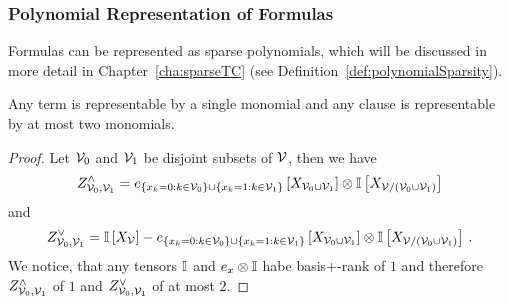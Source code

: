 

\subsubsection{Polynomial Representation of Formulas}


Formulas can be represented as sparse polynomials, which will be discussed in more detail in Chapter~\ref{cha:sparseTC} (see Definition~\ref{def:polynomialSparsity}).

\begin{lemma}\label{lem:clauseTermBasisPlus}
	Any term is representable by a single monomial and any clause is representable by at most two monomials. %
\end{lemma}
\begin{proof}
	Let $\mathcal{V}_0$ and $\mathcal{V}_1$ be disjoint subsets of $\mathcal{V}$, then we have
	\begin{align*}
		Z^{\land}_{\mathcal{V}_0,\mathcal{V}_1} = e_{
			\{x_{k} = 0 : k\in\mathcal{V}_0\} \cup \{x_{k} = 1 : k\in\mathcal{V}_1\}
		}\left[X_{\mathcal{V}_0\cup\mathcal{V}_1}\right] \otimes \mathbb{I}\left[X_{\mathcal{V}/(\mathcal{V}_0\cup\mathcal{V}_1)}\right]
	\end{align*}
	and
	\begin{align*}
		Z^{\lor}_{\mathcal{V}_0,\mathcal{V}_1} = \mathbb{I}\left[X_{\mathcal{V}}\right] - e_{
			\{x_{k} = 0 : k\in\mathcal{V}_0\} \cup \{x_{k} = 1 : k\in\mathcal{V}_1\}
		}\left[X_{\mathcal{V}_0\cup\mathcal{V}_1}\right]
		\otimes \mathbb{I}\left[X_{\mathcal{V}/(\mathcal{V}_0\cup\mathcal{V}_1)}\right] \, . 
	\end{align*}
	We notice, that any tensors $\mathbb{I}$ and $e_{x}\otimes \mathbb{I}$ habe basis+-rank of $1$ and therefore $Z^{\land}_{\mathcal{V}_0,\mathcal{V}_1}$ of $1$ and $Z^{\lor}_{\mathcal{V}_0,\mathcal{V}_1}$ of at most $2$.
\end{proof}



